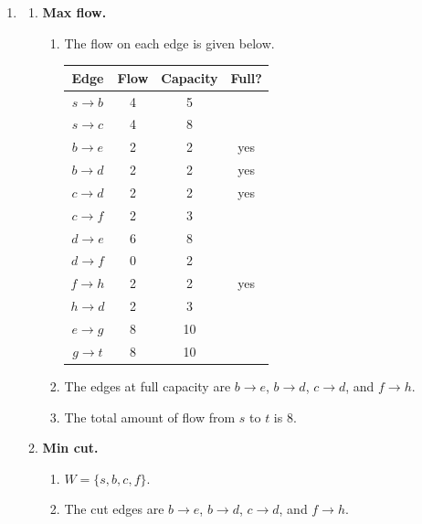 \documentclass[12pt]{article}
\begin{document}
\begin{enumerate}
  \item
    \begin{enumerate}
      \item \textbf{Max flow.}
        \begin{enumerate}
          \item The flow on each edge is given below.

            \begin{center}
              \begin{tabular}{c|c|c|c}
                Edge & Flow & Capacity & Full? \\ \hline
                $s \to b$ & 4 & 5 & \\
                $s \to c$ & 4 & 8 & \\
                $b \to e$ & 2 & 2 & yes \\
                $b \to d$ & 2 & 2 & yes \\
                $c \to d$ & 2 & 2 & yes \\
                $c \to f$ & 2 & 3 & \\
                $d \to e$ & 6 & 8 & \\
                $d \to f$ & 0 & 2 & \\
                $f \to h$ & 2 & 2 & yes \\
                $h \to d$ & 2 & 3 & \\
                $e \to g$ & 8 & 10 & \\
                $g \to t$ & 8 & 10 &
              \end{tabular}
            \end{center}

          \item The edges at full capacity are $b \to e$, $b \to d$,
            $c \to d$, and $f \to h$.

          \item The total amount of flow from $s$ to $t$ is $8$.
        \end{enumerate}

      \item \textbf{Min cut.}
        \begin{enumerate}
          \item $W = \{s, b, c, f\}$.

          \item The cut edges are $b \to e$, $b \to d$, $c \to d$,
            and $f \to h$.


\end{enumerate}
\end{enumerate}
\end{enumerate}
\end{document}
